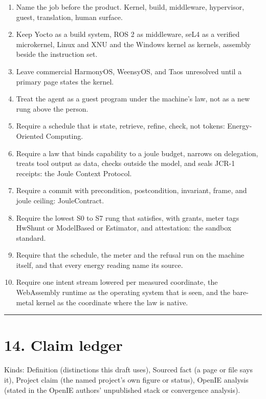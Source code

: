 \documentclass[10pt,letterpaper]{article}
\providecommand{\tightlist}{\setlength{\itemsep}{1pt}\setlength{\parskip}{0pt}}
\begin{document}
\begin{enumerate}
\def\labelenumi{\arabic{enumi}.}
\tightlist
\item
  Name the job before the product. Kernel, build, middleware,
  hypervisor, guest, translation, human surface.
\item
  Keep Yocto as a build system, ROS 2 as middleware, seL4 as a verified
  microkernel, Linux and XNU and the Windows kernel as kernels, assembly
  beside the instruction set.
\item
  Leave commercial HarmonyOS, WeensyOS, and Taos unresolved until a
  primary page states the kernel.
\item
  Treat the agent as a guest program under the machine's law, not as a
  new rung above the person.
\item
  Require a schedule that is state, retrieve, refine, check, not tokens:
  Energy-Oriented Computing.
\item
  Require a law that binds capability to a joule budget, narrows on
  delegation, treats tool output as data, checks outside the model, and
  seals JCR-1 receipts: the Joule Context Protocol.
\item
  Require a commit with precondition, postcondition, invariant, frame,
  and joule ceiling: JouleContract.
\item
  Require the lowest S0 to S7 rung that satisfies, with grants, meter
  tags HwShunt or ModelBased or Estimator, and attestation: the sandbox
  standard.
\item
  Require that the schedule, the meter and the refusal run on the
  machine itself, and that every energy reading name its source.
\item
  Require one intent stream lowered per measured coordinate, the
  WebAssembly runtime as the operating system that is seen, and the
  bare-metal kernel as the coordinate where the law is native.
\end{enumerate}

\begin{center}\rule{0.5\linewidth}{0.5pt}\end{center}

\section{14. Claim ledger}\label{claim-ledger}

Kinds: Definition (distinctions this draft uses), Sourced fact (a page
or file says it), Project claim (the named project's own figure or
status), OpenIE analysis (stated in the OpenIE authors' unpublished
stack or convergence analysis).
\end{document}
